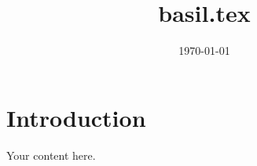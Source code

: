 \documentclass{article}
\title{basil.tex}
\author{}
\date{\today}
\begin{document}
\maketitle

\section{Introduction}

Your content here.
\end{document}
